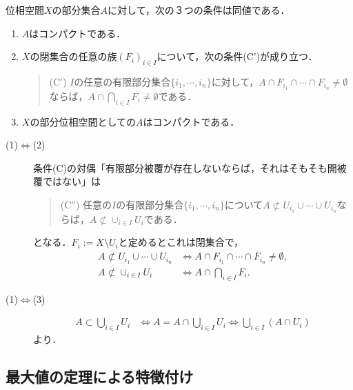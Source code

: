 \documentclass[uplatex,dvipdfmx]{jsreport}
\begin{document}
\begin{proposition}\label{prop-characterization-of-compactness-as-space}
    位相空間$X$の部分集合$A$に対して，次の３つの条件は同値である．
    \begin{enumerate}
        \item $A$はコンパクトである．
        \item $X$の閉集合の任意の族$(F_i)_{i\in I}$について，次の条件(C')が成り立つ．\begin{quote}
            (C') $I$の任意の有限部分集合$\{i_1,\cdots,i_n\}$に対して，$A\cap F_{i_1}\cap\cdots\cap F_{i_n}\ne\emptyset$ならば，$A\cap\bigcap_{i\in I}F_i\ne\emptyset$である．
        \end{quote}
        \item $X$の部分位相空間としての$A$はコンパクトである．
    \end{enumerate}
\end{proposition}
\begin{Proof}
    \begin{description}
        \item[(1)$\Leftrightarrow$(2)] 条件(C)の対偶「有限部分被覆が存在しないならば，それはそもそも開被覆ではない」は
        \begin{quote}
            (C'') 任意の$I$の有限部分集合$\{i_1,\cdots,i_n\}$について$A\not\subset U_{i_1}\cup\cdots\cup U_{i_n}$ならば，$A\not\subset \cup_{i\in I}U_i$である．
        \end{quote}
        となる．$F_i:=X\setminus U_i$と定めるとこれは閉集合で，
        \begin{align*}
            A\not\subset U_{i_1}\cup\cdots\cup U_{i_n}&\Leftrightarrow A\cap F_{i_1}\cap\cdots\cap F_{i_n}\ne\emptyset,\\
            A\not\subset \cup_{i\in I}U_i&\Leftrightarrow A\cap\bigcap_{i\in I}F_i.
        \end{align*}
        \item[(1)$\Leftrightarrow$(3)]
        \begin{align*}
            A\subset\bigcup_{i\in I}U_i&\Leftrightarrow A=A\cap\bigcup_{i\in I}U_i\Leftrightarrow \bigcup_{i\in I}(A\cap U_i)
        \end{align*}
        より．
    \end{description}
\end{Proof}

\subsection{最大値の定理による特徴付け}
\end{document}
